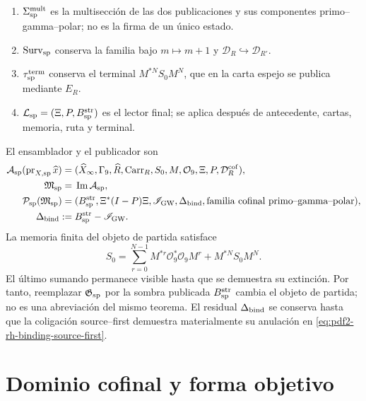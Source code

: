 \begin{enumerate}
 regulador para todos los canales.
 \item \(\Sigma_{\rm sp}^{\rm mult}\) es la multisección de las dos
 publicaciones y sus componentes primo--gamma--polar; no es la firma de un
 único estado.
 \item \(\operatorname{Surv}_{\rm sp}\) conserva la familia bajo
 \(m\mapsto m+1\) y \(\mathcal D_R\hookrightarrow\mathcal D_{R'}\).
 \item \(\tau_{\rm sp}^{\rm term}\) conserva el terminal
 \(M^{*N}S_0M^N\), que en la carta espejo se publica mediante \(E_R\).
    \item \(\mathcal L_{\rm sp}=(\Xi,P,B_{\rm sp}^{\rm str})\) es el lector final; se aplica
 después de antecedente, cartas, memoria, ruta y terminal.
\end{enumerate}

El ensamblador y el publicador son
\begin{equation}\label{eq:pdf2-rh-ensamblador-sp}
\begin{aligned}
 \mathcal A_{\rm sp}(\operatorname{pr}_{X,{\rm sp}}\widehat x)
  ={}&(\widehat X_\infty,\Gamma_9,\widehat R,
      \operatorname{Carr}_R,S_0,M,\mathcal O_9,
      \Xi,P,\mathcal D_R^{\rm cof}),\\
 \mathfrak M_{\rm sp}={}&\operatorname{Im}\mathcal A_{\rm sp},\\
 \mathcal P_{\rm sp}(\mathfrak M_{\rm sp})
  ={}&(B_{\rm sp}^{\rm str},\Xi^*(I-P)\Xi,
       \mathscr I_{\rm GW},\Delta_{\rm bind},
       \text{familia cofinal primo--gamma--polar}),\\
 \Delta_{\rm bind}:={}&B_{\rm sp}^{\rm str}-\mathscr I_{\rm GW}.
\end{aligned}
\end{equation}
La memoria finita del objeto de partida satisface
\begin{equation}\label{eq:pdf2-rh-stein-finito}
 S_0=\sum_{r=0}^{N-1}M^{*r}\mathcal O_9^*\mathcal O_9M^r
     +M^{*N}S_0M^N.
\end{equation}
El último sumando permanece visible hasta que se demuestra su extinción. Por
tanto, reemplazar \(\mathfrak G_{\rm sp}\) por la sombra publicada
\(B_{\rm sp}^{\rm str}\) cambia el objeto de partida; no es una abreviación
del mismo teorema. El residual \(\Delta_{\rm bind}\) se conserva hasta que la
coligación source--first demuestra materialmente su anulación en
\eqref{eq:pdf2-rh-binding-source-first}.

\section{Dominio cofinal y forma objetivo}

